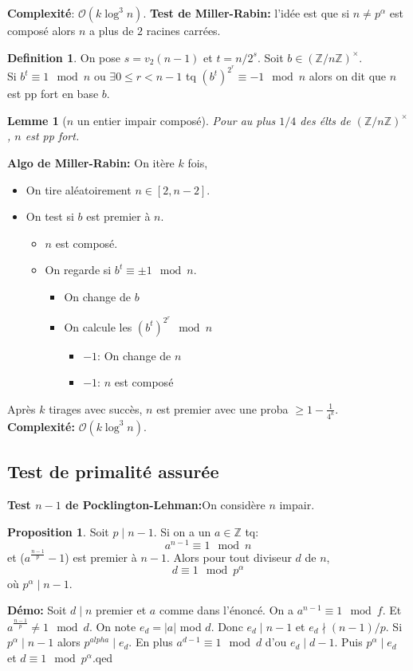 \documentclass[12pt]{article}
\theoremstyle{plain}
\newtheorem{lem}[subsubsection]{Lemme}
\theoremstyle{definition}
\newtheorem{defn}[subsubsection]{Definition}
\newtheorem{prop}[subsubsection]{Proposition}
\newcommand{\Z}{\mathbb{Z}}
\newcommand{\Or}{\mathcal{O}}
\begin{document}
\textbf{Complexité}: $\Or(k\log^3n)$.
\newpage 
\textbf{Test de Miller-Rabin:} l'idée est que si 
$n\ne p^{\alpha}$ est composé alors $n$ a plus de $2$ racines 
carrées.

\begin{defn}
    On pose $s=v_2(n-1)$ et $t=n/2^s$. Soit $b\in(\Z/n\Z)^\times$.
    \\\indent Si $b^t\equiv 1\mod n$ ou $\exists 0\leq r<n-1$ tq 
    $(b^t)^{2^r}\equiv -1\mod n$ alors on dit que $n$ 
    est pp fort en base $b$.
\end{defn}
\begin{lem}[$n$ un entier impair composé]
    Pour au plus $1/4$ des élts de $(\Z/n\Z)^{\times}$,
    $n$ est pp fort.
\end{lem}
\textbf{Algo de Miller-Rabin:} On itère $k$ fois,
\begin{itemize}
    \item On tire aléatoirement $n\in[2,n-2]$.
    \item On test si $b$ est premier à $n$.
    \begin{itemize}
        \item[Non] $n$ est composé.
        \item[Oui] On regarde si $b^t\equiv\pm1\mod n$.
        \begin{itemize}
            \item[Si oui:] On change de $b$
            \item[Sinon:] On calcule les $(b^t)^{2^r}\mod n$
            \begin{itemize}
                \item[Un]$-1$: On change de $n$
                \item[Pas de]$-1$: $n$ est composé
            \end{itemize}
        \end{itemize}
    \end{itemize}
\end{itemize}
Après $k$ tirages avec succès, $n$ est premier avec une 
proba $\geq 1-\frac{1}{4^k}$.\\
\indent \textbf{Complexité:} $\Or(k\log^3n)$.

\subsection{Test de primalité assurée}
\textbf{Test $n-1$ de Pocklington-Lehman:}On considère 
$n$ impair.
\begin{prop}
    Soit $p\mid n-1$. Si on a un $a\in\Z$ tq:
    \[a^{n-1}\equiv 1\mod n\]    
    et ($a^{\frac{n-1}{p}}-1$) est premier à $n-1$.
    Alors pour tout diviseur $d$ de $n$, \[d\equiv1\mod 
    p^{\alpha}\] où $p^{\alpha}\mid n-1$.
\end{prop}
\indent \textbf{Démo:} Soit $d\mid n$ premier et $a$ comme dans 
l'énoncé. On a $a^{n-1}\equiv1\mod f$. Et $a^{\frac{n-1}{p}}
\neq 1\mod d$. On note $e_d=\lvert a\rvert$ mod $d$. Donc $e_d\mid n-1$
et $e_d\nmid (n-1)/p$. Si $p^{\alpha}\mid n-1$ alors $p^{alpha}
\mid e_d$. En plus $a^{d-1}\equiv 1\mod d$ d'ou $e_d\mid d-1$.
Puis $p^{\alpha}\mid e_d$ et $d\equiv 1\mod p^{\alpha}$.qed
\end{document}
